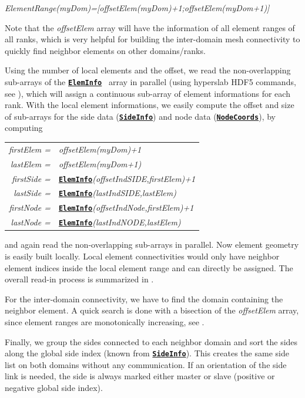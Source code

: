 \documentclass[a4paper,headsepline]{scrreprt}
\newcommand\rf[1]{\prettyref{#1}}
\newcommand\ttbf[1]{\textbf{\texttt{#1}}}
\newcommand\ElemInfo{\hyperlink{ElemInfo}{\ttbf{ElemInfo}}}
\newcommand\SideInfo{\hyperlink{SideInfo}{\ttbf{SideInfo}}}
\newcommand\NodeCoords{\hyperlink{NodeInfo}{\ttbf{NodeCoords}}}
\begin{document}
\textit{ElementRange(myDom)=[offsetElem(myDom)+1;offsetElem(myDom+1)]}

Note that the \textit{offsetElem} array will have the information of all element ranges of all ranks, which is very helpful for building the inter-domain mesh connectivity to quickly find neighbor elements on other domains/ranks.

Using the number of local elements and the offset, we read the non-overlapping sub-arrays of the \ElemInfo~ array in parallel (using hyperslab HDF5 commands, see \rf{alg:hdfarray}), which will assign a continuous sub-array of element informations for each rank. With the local element informations, we easily compute the offset and size of sub-arrays for the side data (\SideInfo) and node data (\NodeCoords), by computing

\begin{tabular}{rl}
\textit{firstElem =} & \textit{offsetElem(myDom)+1} \\
\textit{ lastElem =} & \textit{offsetElem(myDom+1)} \\[2ex]
\textit{firstSide =}&\ElemInfo\textit{(offsetIndSIDE,firstElem)+1 } \\ 
\textit{ lastSide =}& \ElemInfo\textit{(lastIndSIDE,lastElem) } \\[2ex]
\textit{firstNode =}& \ElemInfo\textit{(offsetIndNode,firstElem)+1 } \\ 
\textit{ lastNode =}& \ElemInfo\textit{(lastIndNODE,lastElem) } \\
\end{tabular}

and again read the non-overlapping sub-arrays in parallel. Now element geometry is easily built locally. Local element connectivities would only have neighbor element indices inside the local element range and can directly be assigned. The overall read-in process is summarized in \rf{alg:readmesh}.

For the inter-domain connectivity, we have to find the domain containing the neighbor element. A quick search is done with a bisection of the \textit{offsetElem} array, since element ranges are monotonically increasing, see \rf{alg:elemID}.

Finally, we group the sides connected to each neighbor domain and sort the sides along the global side index (known from \SideInfo). This creates the same side list on both domains without any communication. If an orientation of the side link is needed, the side is always marked either master or slave (positive or negative global side index).
\end{document}
